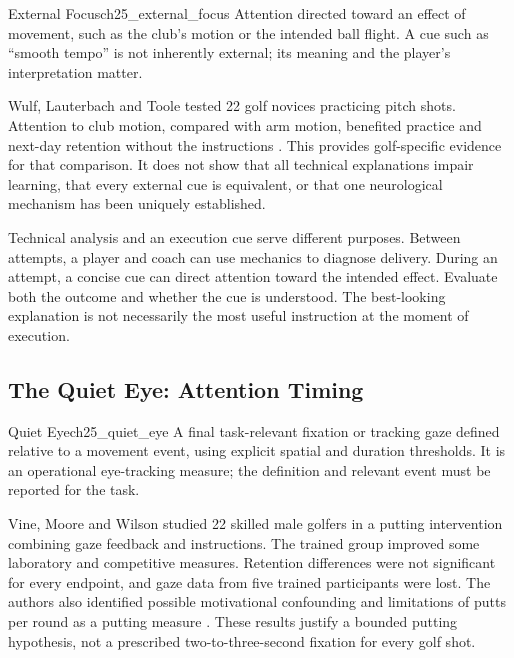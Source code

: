 \begin{definition}{External Focus}{ch25_external_focus}
Attention directed toward an effect of movement, such as the club's motion or the intended ball flight. A cue such as ``smooth tempo'' is not inherently external; its meaning and the player's interpretation matter.
\end{definition}

Wulf, Lauterbach and Toole tested 22 golf novices practicing pitch shots. Attention to club motion, compared with arm motion, benefited practice and next-day retention without the instructions \citep{wulf1999golf}. This provides golf-specific evidence for that comparison. It does not show that all technical explanations impair learning, that every external cue is equivalent, or that one neurological mechanism has been uniquely established.

Technical analysis and an execution cue serve different purposes. Between attempts, a player and coach can use mechanics to diagnose delivery. During an attempt, a concise cue can direct attention toward the intended effect. Evaluate both the outcome and whether the cue is understood. The best-looking explanation is not necessarily the most useful instruction at the moment of execution.

\subsection{The Quiet Eye: Attention Timing}
\label{subsec:ch25_quiet_eye}

\begin{definition}{Quiet Eye}{ch25_quiet_eye}
A final task-relevant fixation or tracking gaze defined relative to a movement event, using explicit spatial and duration thresholds. It is an operational eye-tracking measure; the definition and relevant event must be reported for the task.
\end{definition}

Vine, Moore and Wilson studied 22 skilled male golfers in a putting intervention combining gaze feedback and instructions. The trained group improved some laboratory and competitive measures. Retention differences were not significant for every endpoint, and gaze data from five trained participants were lost. The authors also identified possible motivational confounding and limitations of putts per round as a putting measure \citep{vine2011competitive}. These results justify a bounded putting hypothesis, not a prescribed two-to-three-second fixation for every golf shot.

